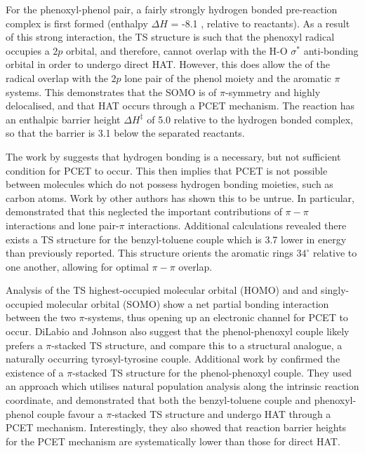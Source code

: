 For the phenoxyl-phenol pair, a fairly strongly hydrogen bonded pre-reaction complex is first formed (enthalpy $\Delta H$ = -8.1 \kcalmol, relative to reactants). As a result of this strong interaction, the TS structure is such that the phenoxyl radical occupies a $2p$ orbital, and therefore, cannot overlap with the H-O $\sigma^*$ anti-bonding orbital in order to undergo direct HAT. However, this does allow the of the radical overlap with the $2p$ lone pair of the phenol moiety and the aromatic $\pi$ systems. This demonstrates that the SOMO is of $\pi$-symmetry and highly delocalised, and that HAT occurs through a PCET mechanism. The reaction has an enthalpic barrier height $\Delta H^{\ddagger}$ of 5.0 \kcalmol relative to the hydrogen bonded complex, so that the barrier is 3.1 \kcalmol below the separated reactants.

The work by \citet{Mayer2002} suggests that hydrogen bonding is a necessary, but not sufficient condition for PCET to occur. This then implies that PCET is not possible between molecules which do not possess hydrogen bonding moieties, such as carbon atoms. Work by other authors has shown this to be untrue.\cite{Hatcher2007, DiLabio2007} In particular, \citet{DiLabio2007} demonstrated that this neglected the important contributions of $\pi-\pi$ interactions and lone pair-$\pi$ interactions. Additional calculations revealed there exists a TS structure for the benzyl-toluene couple which is 3.7 \kcalmol lower in energy than previously reported. This structure orients the aromatic rings $34^\circ$ relative to one another, allowing for optimal $\pi-\pi$ overlap.

Analysis of the TS highest-occupied molecular orbital (HOMO) and and singly-occupied molecular orbital (SOMO) show a net partial bonding interaction between the two $\pi$-systems, thus opening up an electronic channel for PCET to occur. DiLabio and Johnson also suggest that the phenol-phenoxyl couple likely prefers a $\pi$-stacked TS structure, and compare this to a structural analogue, a naturally occurring tyrosyl-tyrosine couple. Additional work by \citet{MunozRugeles2017} confirmed the existence of a $\pi$-stacked TS structure for the phenol-phenoxyl couple. They used an approach which utilises natural population analysis along the intrinsic reaction coordinate, and demonstrated that both the benzyl-toluene couple and phenoxyl-phenol couple favour a $\pi$-stacked TS structure and undergo HAT through a PCET mechanism. Interestingly, they also showed that reaction barrier heights for the PCET mechanism are systematically lower than those for direct HAT.

